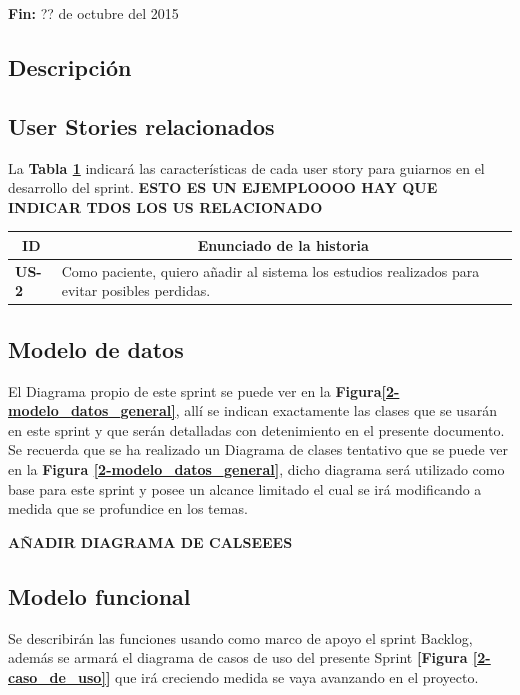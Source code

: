 \documentclass[a4paper,12pt]{article}
\begin{document}
\textbf{Fin:} ?? de octubre del 2015



\subsection{Descripción}

\subsection{User Stories relacionados}
La \textbf{Tabla \ref{US-Sprint9}} indicará las características de cada user story para guiarnos en el desarrollo del sprint.
\textbf{ESTO ES UN EJEMPLOOOO HAY QUE INDICAR TDOS LOS US RELACIONADO}
\begin{table}[h]
    \label{US-Sprint9}
    \centering
	\begin{tabular}{|l|p{9cm}|}
	\hline
        \multicolumn{1}{|c|}{\textbf{ID}} &
        \multicolumn{1}{|c|}{\textbf{Enunciado de la historia}} \\          
    \hline
        \textbf{US-2 } & Como paciente, quiero añadir al sistema los estudios realizados para evitar posibles perdidas.\\
     \hline 
     
    \end{tabular}

\end{table}

\subsection{Modelo de datos}
El Diagrama propio de este sprint se puede ver en la \textbf{Figura\ref{2-modelo_datos_general}}, allí se indican exactamente las clases que se usarán en este sprint y que serán detalladas con detenimiento en el presente documento. Se recuerda que se ha realizado un Diagrama de clases tentativo que se puede ver en la \textbf{Figura \ref{2-modelo_datos_general}}, dicho diagrama  será utilizado como base para este sprint y posee un alcance limitado el cual se irá modificando a medida que se profundice en los temas.


\textbf{AÑADIR DIAGRAMA DE CALSEEES}


\subsection{Modelo funcional} %
Se describirán las funciones usando como marco de apoyo el sprint Backlog, además se armará el diagrama de casos de uso del presente Sprint \textbf{[Figura \ref{2-caso_de_uso}]} que irá creciendo  medida se vaya avanzando en el proyecto.
\end{document}
